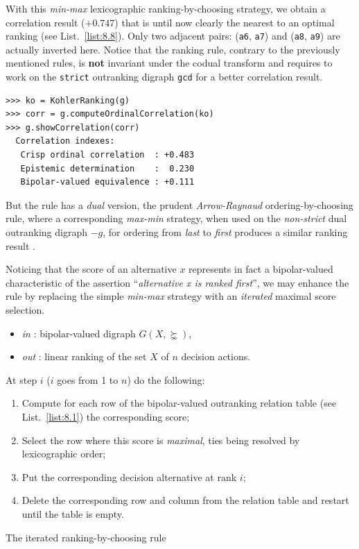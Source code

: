 With this \emph{min-max} lexicographic ranking-by-choosing strategy, we obtain a correlation result ($+0.747$) that is until now clearly the nearest to an optimal \Kemeny ranking (see List.~\vref{list:8.8}). Only two adjacent pairs: (\texttt{a6}, \texttt{a7}) and (\texttt{a8}, \texttt{a9}) are actually inverted here. Notice that the \Kohler ranking rule, contrary to the previously mentioned rules, is \textbf{not} invariant under the codual transform and requires to work on the \texttt{strict} outranking digraph \texttt{gcd} for a better correlation result.
\begin{lstlisting}
>>> ko = KohlerRanking(g)  
>>> corr = g.computeOrdinalCorrelation(ko)
>>> g.showCorrelation(corr)
  Correlation indexes:
   Crisp ordinal correlation  : +0.483
   Epistemic determination    :  0.230
   Bipolar-valued equivalence : +0.111
\end{lstlisting}

But the \Kohler rule has a \emph{dual} version, the prudent \emph{Arrow-Raynaud} ordering-by-choosing rule, where a corresponding \emph{max-min} strategy, when used on the \emph{non-strict} dual outranking digraph $-g$, for ordering from \emph{last} to \emph{first} produces a similar ranking result \citep{ARR-1986}.

Noticing that the \NetFlows score of an alternative $x$ represents in fact a bipolar-valued characteristic of the assertion ``\emph{alternative x is ranked first}'', we may enhance the \Kohler rule by replacing the simple \emph{min-max} strategy with an \emph{iterated} maximal \NetFlows score selection.

\begin{algorithm}[H]
  {\normalsize
\begin{itemize}
 \item [] \emph{in} : bipolar-valued digraph $G(X,\succnsim)$,
 \item [] \emph{out} : linear ranking of the set $X$ of $n$ decision actions.
\end{itemize}
At step $i$ ($i$ goes from 1 to $n$) do the following:
\begin{enumerate}[leftmargin=0.5cm,rightmargin=0.5cm,topsep=1pt]
\item Compute for each row of the bipolar-valued outranking relation table (see List.~\vref{list:8.1}) the corresponding \NetFlows score;
\item Select the row where this score is \emph{maximal}, ties being resolved by lexicographic order;
\item Put the corresponding decision alternative at rank $i$;
\item Delete the corresponding row and column from the relation table and restart until the table is empty.
\end{enumerate}
}
\caption{The iterated \NetFlows ranking-by-choosing rule}
\label{alg:8.4}
\end{algorithm}


